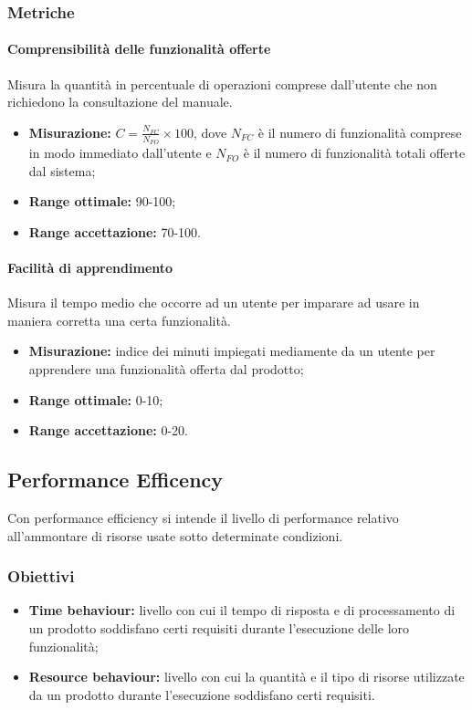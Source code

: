		\subsubsection{Metriche}
			\paragraph{Comprensibilità delle funzionalità offerte} \Spazio 
			Misura la quantità in percentuale di operazioni comprese dall'utente che non richiedono la consultazione del manuale.
			\begin{itemize}
				\item {\textbf{Misurazione:} $C=\frac{N_{FC}}{N_{FO}}\times 100$, dove $N_{FC}$ è il numero di funzionalità comprese in modo immediato dall'utente e $N_{FO}$ è il numero di funzionalità totali offerte dal sistema};
				\item {\textbf{Range ottimale:} 90-100;}
				\item {\textbf{Range accettazione:} 70-100.}
			\end{itemize} 
			\paragraph{Facilità di apprendimento} \Spazio 
			Misura il tempo medio che occorre ad un utente per imparare ad usare in maniera corretta una certa funzionalità.
			\begin{itemize}
				\item {\textbf{Misurazione:} indice dei minuti impiegati mediamente da un utente per apprendere una funzionalità offerta dal prodotto};
				\item {\textbf{Range ottimale:} 0-10;}
				\item {\textbf{Range accettazione:} 0-20.}
			\end{itemize} 
			
	\subsection{Performance Efficency}
		Con performance efficiency si intende il livello di performance relativo all'ammontare di risorse usate sotto determinate condizioni. 
		\subsubsection{Obiettivi}
			\begin{itemize}
				\item {\textbf{Time behaviour:} livello con cui il tempo di risposta e di processamento di un prodotto soddisfano certi requisiti durante l'esecuzione delle loro funzionalità;}
				\item {\textbf{Resource behaviour:} livello con cui la quantità e il tipo di risorse utilizzate da un prodotto durante l'esecuzione soddisfano certi requisiti.}
			\end{itemize}
